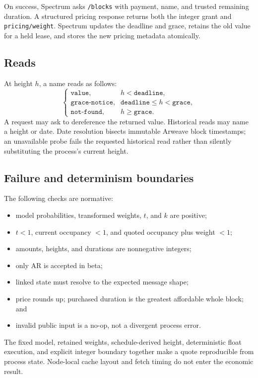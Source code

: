 \documentclass[10pt,twocolumn]{article}
\newcommand{\key}[1]{\texttt{#1}}
\begin{document}
On success, Spectrum asks \key{/blocks} with payment, name, and trusted
remaining duration. A structured pricing response returns both the integer
grant and \key{pricing/weight}. Spectrum updates the deadline and grace, retains
the old value for a held lease, and stores the new pricing metadata atomically.

\subsection{Reads}

At height $h$, a name reads as follows:
\[
\begin{cases}
\key{value}, & h<\key{deadline},\\
\key{grace-notice}, & \key{deadline}\leq h<\key{grace},\\
\key{not-found}, & h\geq\key{grace}.
\end{cases}
\]
A request may ask to dereference the returned value. Historical reads may name
a height or date. Date resolution bisects immutable Arweave block timestamps;
an unavailable probe fails the requested historical read rather than silently
substituting the process's current height.

\subsection{Failure and determinism boundaries}

The following checks are normative:
\begin{itemize}
  \item model probabilities, transformed weights, $t$, and $k$ are positive;
  \item $t<1$, current occupancy $<1$, and quoted occupancy plus weight $<1$;
  \item amounts, heights, and durations are nonnegative integers;
  \item only AR is accepted in beta;
  \item linked state must resolve to the expected message shape;
  \item price rounds up; purchased duration is the greatest affordable whole
        block; and
  \item invalid public input is a no-op, not a divergent process error.
\end{itemize}

The fixed model, retained weights, schedule-derived height, deterministic float
execution, and explicit integer boundary together make a quote reproducible
from process state. Node-local cache layout and fetch timing do not enter the
economic result.
\end{document}
